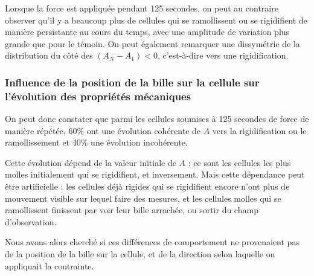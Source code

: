 Lorsque la force est appliquée pendant 125 secondes, on peut au contraire observer qu'il y a beaucoup plus de cellules qui se ramollissent ou se rigidifient de manière persistante au cours du temps, avec une amplitude de variation plus grande que pour le témoin. On peut également remarquer une dissymétrie de la distribution du côté des $(A_N-A_1)<0$, c’est-à-dire vers une rigidification.

\subsubsection{Influence de la position de la bille sur la cellule sur l'évolution des propriétés mécaniques}

On peut donc constater que parmi les cellules soumises à 125 secondes de force de manière répétée, 60\% ont une évolution cohérente de $A$ vers la rigidification ou le ramollissement et 40\% une évolution incohérente. 

Cette évolution dépend de la valeur initiale de $A$ : ce sont les cellules les plus molles initialement qui se rigidifient, et inversement. Mais cette dépendance peut être artificielle : les cellules déjà rigides qui se rigidifient encore n'ont plus de mouvement visible sur lequel faire des mesures, et les cellules molles qui se ramollissent finissent par voir leur bille arrachée, ou sortir du champ d'observation. 

Nous avons alors cherché si ces différences de comportement ne provenaient pas de la position de la bille sur la cellule, et de la direction selon laquelle on appliquait la contrainte. 



